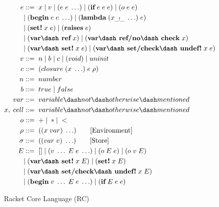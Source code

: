 \begin{figure}[h]
  \begin{mdframed}
    \begin{align*}
      e &::=\; x\; |\; v\; |\; (e\; e\; \ldots)\; |\; (\textbf{if}\; e\; e\; e)\; |\; (o\; e\; e)\; \\
      \; &|\; (\textbf{begin}\; e\; e\; \ldots)\; |\; (\textbf{lambda}\; (x_{\_!\_}\; \ldots)\; e)\\
      \; &|\; (\textbf{set!}\; x\; e)\; |\; (\textbf{raises}\; e)\\
      \; &|\; (\textbf{var\dash ref}\; x)\; |\; (\textbf{var\dash ref/no\dash check}\; x) \\
      \; &|\; (\textbf{var\dash set!}\; x\; e)\; |\; (\textbf{var\dash set/check\dash undef!}\; x\; e) \\
      v   &::=\; n\; |\; b\; |\; c\; |\; (void)\;|\; uninit \\ %
      c   &::=\; (closure\; (x\; \ldots)\; e\; \rho) \\
      n   &::=\; number \\
      b   &::=\; true\; |\; false \\
      var &::=\; variable\dash not\dash otherwise\dash mentioned \\ %
      x,\; cell &::=\; variable\dash not\dash otherwise\dash mentioned \\ %
      o  &::=\; +\; |\; * |\; < \\
      \rho   &::=\; ((x\; var)\; \ldots) \tag*{[Environment]}\\
      \sigma   &::=\; ((var\; v)\; \ldots) \tag*{[Store]}\\
      E   &::=\; []\; |\; (v\; \ldots\; E\; e\; \ldots)\; |\; (o\; E\; e)\; |\; (o\; v\; E) \\
      \;  &|\; (\textbf{var\dash set!}\; x\; E)\; |\; (\textbf{set!}\; x\; E)\; \\
      \;  &|\; (\textbf{var\dash set/check\dash undef!}\; x\; E) \\
      \;  &|\; (\textbf{begin}\; v\; \ldots\; E\; e\; \ldots)\; |\; (\textbf{if}\; E\; e\; e)
    \end{align*}
    \caption{Racket Core Language (RC)}
    \label{fig:racket-source}
  \end{mdframed}
\end{figure}

